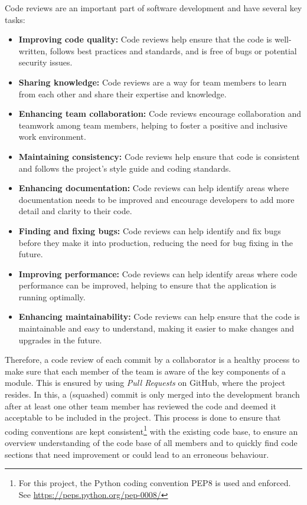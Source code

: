 \documentclass{article}
\begin{document}
        Code reviews are an important part of software development and have several key tasks:
        \begin{itemize}

            \item \textbf{Improving code quality:} Code reviews help ensure that the code is well-written, follows best practices and standards, and is free of bugs or potential security issues.
            
            \item \textbf{Sharing knowledge:} Code reviews are a way for team members to learn from each other and share their expertise and knowledge.

            \item \textbf{Enhancing team collaboration:} Code reviews encourage collaboration and teamwork among team members, helping to foster a positive and inclusive work environment.

            \item \textbf{Maintaining consistency:} Code reviews help ensure that code is consistent and follows the project's style guide and coding standards.

            \item \textbf{Enhancing documentation:} Code reviews can help identify areas where documentation needs to be improved and encourage developers to add more detail and clarity to their code.

            \item \textbf{Finding and fixing bugs:} Code reviews can help identify and fix bugs before they make it into production, reducing the need for bug fixing in the future.

            \item \textbf{Improving performance:} Code reviews can help identify areas where code performance can be improved, helping to ensure that the application is running optimally.

            \item \textbf{Enhancing maintainability:} Code reviews can help ensure that the code is maintainable and easy to understand, making it easier to make changes and upgrades in the future.

        \end{itemize}
            Therefore, a code review of each commit by a collaborator is a healthy process to make sure that each member of the team is aware of the key components of a module.
            This is ensured by using \emph{Pull Requests} on GitHub, where the project resides. In this, a (squashed) commit is only merged into the development branch after at least one other team member has reviewed the code and deemed it acceptable to be included in the project.
            This process is done to ensure that coding conventions are kept consistent\footnote{For this project, the Python coding convention PEP8 is used and enforced. See \url{https://peps.python.org/pep-0008/}} with the existing code base, to ensure an overview understanding of the code base of all members and to quickly find code sections that need improvement or could lead to an erroneous behaviour.
\end{document}
